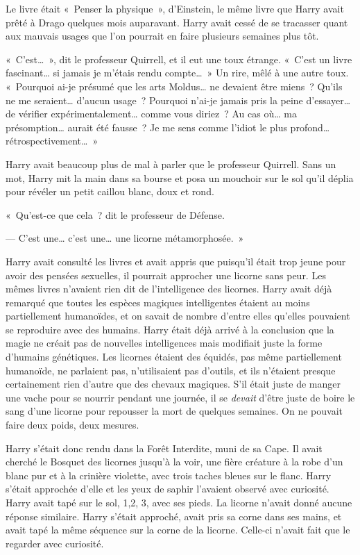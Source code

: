 Le livre était «~Penser la physique~», d'Einstein, le même livre que Harry avait prêté à Drago quelques mois auparavant. Harry avait cessé de se tracasser quant aux mauvais usages que l'on pourrait en faire plusieurs semaines plus tôt.

«~C'est…~», dit le professeur Quirrell, et il eut une toux étrange. «~C'est un livre fascinant… si jamais je m'étais rendu compte…~» Un rire, mêlé à une autre toux. «~Pourquoi ai-je présumé que les arts Moldus… ne devaient être miens~? Qu'ils ne me seraient… d'aucun usage~? Pourquoi n'ai-je jamais pris la peine d'essayer… de vérifier expérimentalement… comme vous diriez~? Au cas où… ma présomption… aurait été fausse~? Je me sens comme l'idiot le plus profond… rétrospectivement…~»

Harry avait beaucoup plus de mal à parler que le professeur Quirrell. Sans un mot, Harry mit la main dans sa bourse et posa un mouchoir sur le sol qu'il déplia pour révéler un petit caillou blanc, doux et rond.

«~Qu'est-ce que cela~? dit le professeur de Défense.

--- C'est une… c'est une… une licorne métamorphosée.~»

Harry avait consulté les livres et avait appris que puisqu'il était trop jeune pour avoir des pensées sexuelles, il pourrait approcher une licorne sans peur. Les mêmes livres n'avaient rien dit de l'intelligence des licornes. Harry avait déjà remarqué que toutes les espèces magiques intelligentes étaient au moins partiellement humanoïdes, et on savait de nombre d'entre elles qu'elles pouvaient se reproduire avec des humains. Harry était déjà arrivé à la conclusion que la magie ne créait pas de nouvelles intelligences mais modifiait juste la forme d'humains génétiques. Les licornes étaient des équidés, pas même partiellement humanoïde, ne parlaient pas, n'utilisaient pas d'outils, et ils n'étaient presque certainement rien d'autre que des chevaux magiques. S'il était juste de manger une vache pour se nourrir pendant une journée, il se \emph{devait} d'être juste de boire le sang d'une licorne pour repousser la mort de quelques semaines. On ne pouvait faire deux poids, deux mesures.

Harry s'était donc rendu dans la Forêt Interdite, muni de sa Cape. Il avait cherché le Bosquet des licornes jusqu'à la voir, une fière créature à la robe d'un blanc pur et à la crinière violette, avec trois taches bleues sur le flanc. Harry s'était approchée d'elle et les yeux de saphir l'avaient observé avec curiosité. Harry avait tapé sur le sol, 1,2, 3, avec ses pieds. La licorne n'avait donné aucune réponse similaire. Harry s'était approché, avait pris sa corne dans ses mains, et avait tapé la même séquence sur la corne de la licorne. Celle-ci n'avait fait que le regarder avec curiosité.

